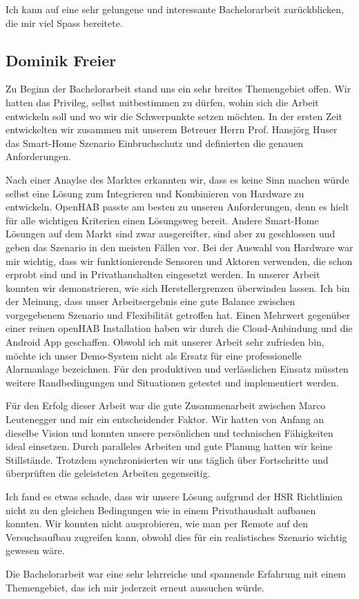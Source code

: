 Ich kann auf eine sehr gelungene und interessante Bachelorarbeit zurückblicken, die mir viel Spass bereitete.

\pagebreak

\subsection*{Dominik Freier}
Zu Beginn der Bachelorarbeit stand uns ein sehr breites Themengebiet offen. Wir hatten das Privileg, selbst mitbestimmen zu dürfen, wohin sich die Arbeit entwickeln soll und wo wir die Schwerpunkte setzen möchten. In der ersten Zeit entwickelten wir zusammen mit unserem Betreuer Herrn Prof. Hansjörg Huser das Smart-Home Szenario Einbruchschutz und definierten die genauen Anforderungen. 

Nach einer Anaylse des Marktes erkannten wir, dass es keine Sinn machen würde selbst eine Lösung zum Integrieren und Kombinieren von Hardware zu entwickeln. OpenHAB passte am besten zu unseren Anforderungen, denn es hielt für alle wichtigen Kriterien einen Lösungsweg bereit. Andere Smart-Home Lösungen auf dem Markt sind zwar ausgereifter, sind aber zu geschlossen und geben das Szenario in den meisten Fällen vor. Bei der Auswahl von Hardware war mir wichtig, dass wir funktionierende Sensoren und Aktoren verwenden, die schon erprobt sind und in Privathaushalten eingesetzt werden. In unserer Arbeit konnten wir demonstrieren, wie sich Herstellergrenzen überwinden lassen. Ich bin der Meinung, dass unser Arbeitsergebnis eine gute Balance zwischen vorgegebenem Szenario und Flexibilität getroffen hat. Einen Mehrwert gegenüber einer reinen openHAB Installation haben wir durch die Cloud-Anbindung und die Android App geschaffen. Obwohl ich mit unserer Arbeit sehr zufrieden bin, möchte ich unser Demo-System nicht als Ersatz für eine professionelle Alarmanlage bezeichnen. Für den produktiven und verlässlichen Einsatz müssten weitere Randbedingungen und Situationen getestet und implementiert werden.

Für den Erfolg dieser Arbeit war die gute Zusammenarbeit zwischen Marco Leutenegger und mir ein entscheidender Faktor. Wir hatten von Anfang an dieselbe Vision und konnten unsere persönlichen und technischen Fähigkeiten ideal einsetzen. Durch paralleles Arbeiten und gute Planung hatten wir keine Stillstände. Trotzdem synchronisierten wir uns täglich über Fortschritte und überprüften die geleisteten Arbeiten gegenseitig. 

Ich fand es etwas schade, dass wir unsere Lösung aufgrund der HSR Richtlinien nicht zu den gleichen Bedingungen wie in einem Privathaushalt aufbauen konnten. Wir konnten nicht ausprobieren, wie man per Remote auf den Versuchsaufbau zugreifen kann, obwohl dies für ein realistisches Szenario wichtig gewesen wäre.

Die Bachelorarbeit war eine sehr lehrreiche und spannende Erfahrung mit einem Themengebiet, das ich mir jederzeit erneut aussuchen würde.

